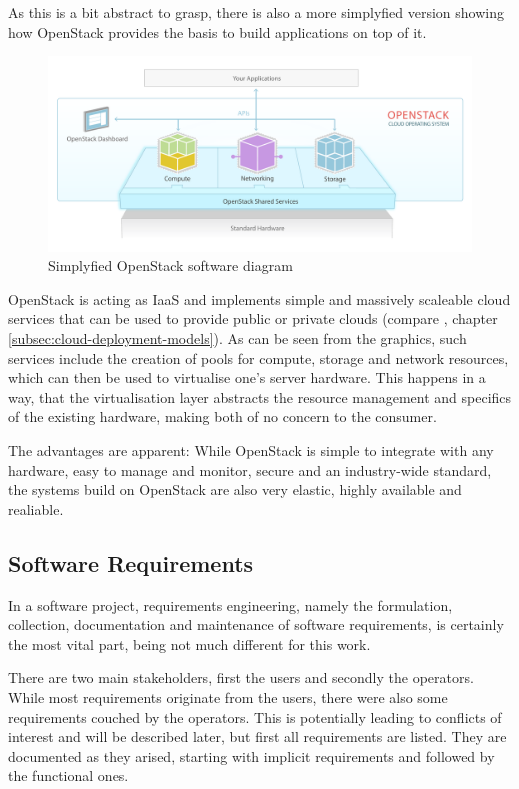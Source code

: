 As this is a bit abstract to grasp, there is also a more simplyfied version showing how {OpenStack} provides the basis to build applications on top of it.

\begin{figure}[H]
	\centering
		\includegraphics[width=\textwidth]{images/openstack-software-diagram.pdf}
	\caption{Simplyfied OpenStack software diagram \cite{website:openstack-sw-diagram}}
\end{figure}

OpenStack is acting as IaaS and implements simple and massively scaleable cloud services that can be used to provide public or private clouds (compare , chapter \ref{subsec:cloud-deployment-models}). As can be seen from the graphics, such services include the creation of pools for compute, storage and network resources, which can then be used to virtualise one's server hardware. This happens in a way, that the virtualisation layer abstracts the resource management and specifics of the existing hardware, making both of no concern to the consumer.

The advantages are apparent: While OpenStack is simple to integrate with any hardware, easy to manage and monitor, secure and an industry-wide standard, the systems build on OpenStack are also very elastic, highly available and realiable.

\subsection{Software Requirements}
\label{subsec:software-requirements}
In a software project, requirements engineering, namely the formulation, collection, documentation and maintenance of software requirements, is certainly the most vital part, being not much different for this work. 

There are two main stakeholders, first the users and secondly the operators. While most requirements originate from the users, there were also some requirements couched by the operators. This is potentially leading to conflicts of interest and will be described later, but first all requirements are listed. They are documented as they arised, starting with implicit requirements and followed by the functional ones.

